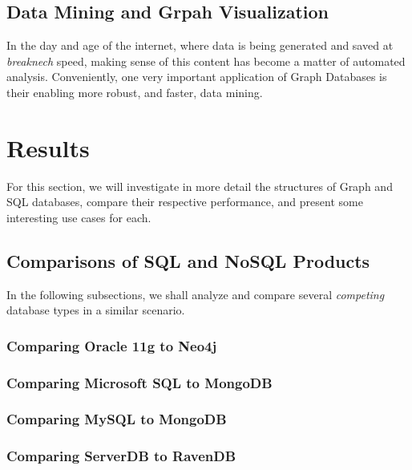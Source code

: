 \documentclass[10pt,        %
               a4paper,     %
               journal,     %
               ]{IEEEtran}
\begin{document}
\subsection{Data Mining and Grpah Visualization}
In the day and age of the internet, where data is being generated and saved at \textit{breaknech} speed, making sense of this content has become a matter of automated analysis. Conveniently, one very important application of Graph Databases is their enabling more robust, and faster, data mining. \par

\section{Results} 
For this section, we will investigate in more detail the structures of Graph and SQL databases, compare their respective performance, and present some interesting use cases for each. \par
\subsection{Comparisons of SQL and NoSQL Products}
In the following subsections, we shall analyze and compare several \textit{competing} database types in a similar scenario.
\subsubsection{Comparing Oracle 11g to Neo4j}

\subsubsection{Comparing Microsoft SQL to MongoDB}

\subsubsection{Comparing MySQL to MongoDB}

\subsubsection{Comparing ServerDB to RavenDB}
\end{document}

